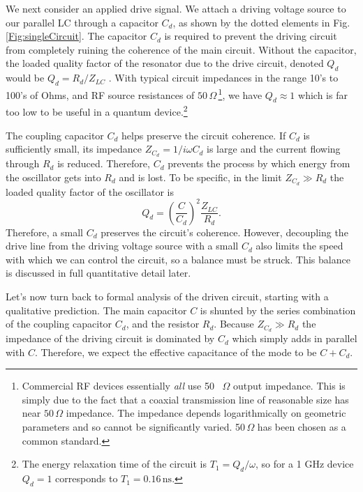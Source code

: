  \label{sec:driving}


We next consider an applied drive signal.
We attach a driving voltage source to our parallel LC through a capacitor $C_d$, as shown by the dotted elements in Fig.\,\ref{Fig:singleCircuit}.
The capacitor $C_d$ is required to prevent the driving circuit from completely ruining the coherence of the main circuit.
Without the capacitor, the loaded quality factor of the resonator due to the drive circuit, denoted $Q_d$ would be $Q_d = R_d / Z_{LC}$ .
With typical circuit impedances in the range 10's to 100's of Ohms, and RF source resistances of $50\,\Omega$\,\footnote{Commercial RF devices essentially \emph{all} use 50 \, $\Omega$ output impedance. This is simply due to the fact that a coaxial transmission line of reasonable size has near $50 \, \Omega$ impedance. The impedance depends logarithmically on geometric parameters and so cannot be significantly varied. 50$ \, \Omega$ has been chosen as a common standard.}, we have $Q_d \approx 1$ which is far too low to be useful in a quantum device.\footnote{The energy relaxation time of the circuit is $T_1 = Q_d / \omega$, so for a 1 GHz device $Q_d=1$ corresponds to $T_1=0.16 \, \text{ns}$.}

The coupling capacitor $C_d$ helps preserve the circuit coherence.
If $C_d$ is sufficiently small, its impedance $Z_{C_d} = 1/i\omega C_d$ is large and the current flowing through $R_d$ is reduced.
Therefore, $C_d$ prevents the process by which energy from the oscillator gets into $R_d$ and is lost.
To be specific, in the limit $Z_{C_d} \gg R_d$ the loaded quality factor of the oscillator is 
\begin{equation}
  Q_d = \left( \frac{C}{C_d} \right)^2 \frac{Z_{LC}}{R_d} .
\end{equation}
Therefore, a small $C_d$ preserves the circuit's coherence.
However, decoupling the drive line from the driving voltage source with a small $C_d$ also limits the speed with which we can control the circuit, so a balance must be struck.
This balance is discussed in full quantitative detail later.

Let's now turn back to formal analysis of the driven circuit, starting with a qualitative prediction.
The main capacitor $C$ is shunted by the series combination of the coupling capacitor $C_d$, and the resistor $R_d$.
Because  $Z_{C_d} \gg R_d$ the impedance of the driving circuit is dominated by $C_d$ which simply adds in parallel with $C$.
Therefore, we expect the effective capacitance of the mode to be $C+C_d$.

